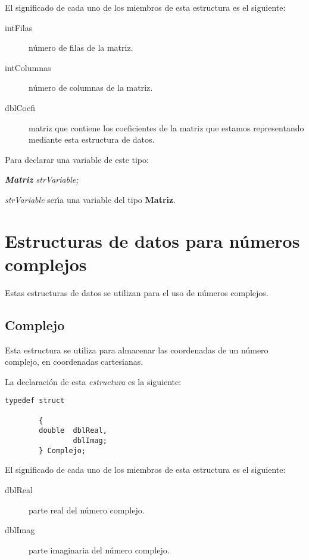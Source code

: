 El significado de cada uno de los miembros de esta estructura es el siguiente:

\begin{description}
\item[intFilas] n\'umero de filas de la matriz.
\item[intColumnas] n\'umero de columnas de la matriz.
\item[dblCoefi] matriz que contiene los coeficientes de la matriz que estamos
representando mediante esta estructura de datos.
\end{description}

Para declarar una variable de este tipo:

\begin{center}
\emph{\textbf{Matriz} strVariable;}
\end{center}

\emph{strVariable} ser\'{\i}a una variable del tipo \textbf{Matriz}.

\section{Estructuras de datos para n\'umeros complejos} \label{sec:complejos}

Estas estructuras de datos se utilizan para el uso de n\'umeros complejos.

\subsection{Complejo}
Esta estructura se utiliza para almacenar las coordenadas de un n\'umero
complejo, en coordenadas cartesianas.\newline

La declaraci\'on de esta \emph{estructura} es la siguiente:

\begin{verbatim}
typedef struct

        {
        double  dblReal,
                dblImag;
        } Complejo;
\end{verbatim}

El significado de cada uno de los miembros de esta estructura es el siguiente:

\begin{description}
\item[dblReal] parte real del n\'umero complejo.
\item[dblImag] parte imaginaria del n\'umero complejo.
\end{description}

